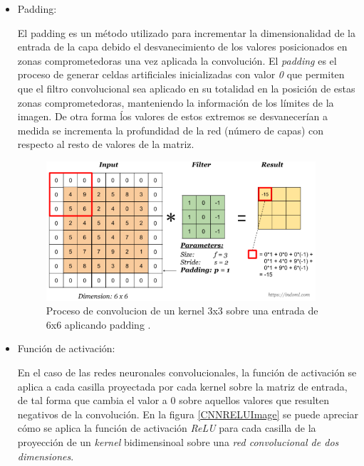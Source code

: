 \begin{itemize}
                    \item Padding:

                        El padding es un método utilizado para incrementar la dimensionalidad de la entrada de la capa debido el desvanecimiento de los valores posicionados en zonas comprometedoras una vez aplicada la convolución. El \textit{padding} es el proceso de generar celdas artificiales inicializadas con valor \textit{0} que permiten que el filtro convolucional sea aplicado en su totalidad en la posición de estas zonas comprometedoras, manteniendo la información de los límites de la imagen. De otra forma ĺos valores de estos extremos se desvanecerían a medida se incrementa la profundidad de la red (número de capas) con respecto al resto de valores de la matriz.\\

                        \begin{figure}[h]
                            \centering
                            \captionsetup{width=.65\textwidth}
                            \includegraphics[width=10cm]{archivos/3.Tecnologias/RedesNeuronales/CNN/padding}
                            \caption{Proceso de convolucion de un kernel 3x3 sobre una entrada de 6x6 aplicando padding \cite{ReferenciaImagenKernelFiltro}.}
                            \label{PaddingImage}
                         \end{figure}


                    \item Función de activación:


                        En el caso de las redes neuronales convolucionales, la función de activación se aplica a cada casilla proyectada por cada kernel sobre la matriz de entrada, de tal forma que cambia el valor a $0$ sobre aquellos valores que resulten negativos de la convolución. En la figura \ref{CNNRELUImage} se puede apreciar cómo se aplica la función de activación \textit{ReLU} para cada casilla de la proyección de un \textit{kernel} bidimensinoal sobre una \textit{red convolucional de dos dimensiones}.




\end{itemize}
